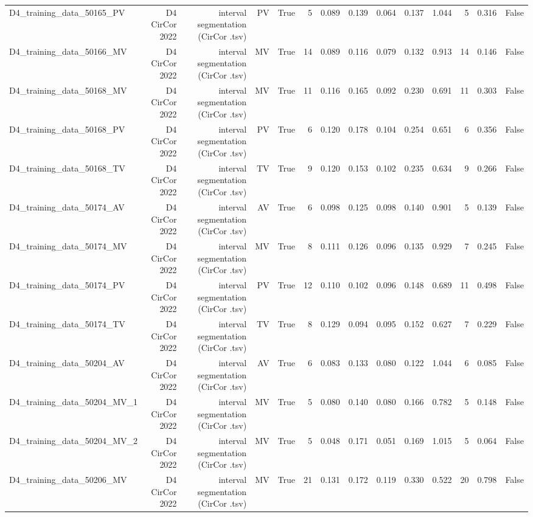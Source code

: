 \begin{table}[htbp]
\begin{tabular}{lrrrrrrrrrrrrr}
    D4\_training\_data\_50165\_PV & D4 CirCor 2022 & interval segmentation (CirCor .tsv) & PV & True & 5 & 0.089 & 0.139 & 0.064 & 0.137 & 1.044 & 5 & 0.316 & False \\
    D4\_training\_data\_50166\_MV & D4 CirCor 2022 & interval segmentation (CirCor .tsv) & MV & True & 14 & 0.089 & 0.116 & 0.079 & 0.132 & 0.913 & 14 & 0.146 & False \\
    D4\_training\_data\_50168\_MV & D4 CirCor 2022 & interval segmentation (CirCor .tsv) & MV & True & 11 & 0.116 & 0.165 & 0.092 & 0.230 & 0.691 & 11 & 0.303 & False \\
    D4\_training\_data\_50168\_PV & D4 CirCor 2022 & interval segmentation (CirCor .tsv) & PV & True & 6 & 0.120 & 0.178 & 0.104 & 0.254 & 0.651 & 6 & 0.356 & False \\
    D4\_training\_data\_50168\_TV & D4 CirCor 2022 & interval segmentation (CirCor .tsv) & TV & True & 9 & 0.120 & 0.153 & 0.102 & 0.235 & 0.634 & 9 & 0.266 & False \\
    D4\_training\_data\_50174\_AV & D4 CirCor 2022 & interval segmentation (CirCor .tsv) & AV & True & 6 & 0.098 & 0.125 & 0.098 & 0.140 & 0.901 & 5 & 0.139 & False \\
    D4\_training\_data\_50174\_MV & D4 CirCor 2022 & interval segmentation (CirCor .tsv) & MV & True & 8 & 0.111 & 0.126 & 0.096 & 0.135 & 0.929 & 7 & 0.245 & False \\
    D4\_training\_data\_50174\_PV & D4 CirCor 2022 & interval segmentation (CirCor .tsv) & PV & True & 12 & 0.110 & 0.102 & 0.096 & 0.148 & 0.689 & 11 & 0.498 & False \\
    D4\_training\_data\_50174\_TV & D4 CirCor 2022 & interval segmentation (CirCor .tsv) & TV & True & 8 & 0.129 & 0.094 & 0.095 & 0.152 & 0.627 & 7 & 0.229 & False \\
    D4\_training\_data\_50204\_AV & D4 CirCor 2022 & interval segmentation (CirCor .tsv) & AV & True & 6 & 0.083 & 0.133 & 0.080 & 0.122 & 1.044 & 6 & 0.085 & False \\
    D4\_training\_data\_50204\_MV\_1 & D4 CirCor 2022 & interval segmentation (CirCor .tsv) & MV & True & 5 & 0.080 & 0.140 & 0.080 & 0.166 & 0.782 & 5 & 0.148 & False \\
    D4\_training\_data\_50204\_MV\_2 & D4 CirCor 2022 & interval segmentation (CirCor .tsv) & MV & True & 5 & 0.048 & 0.171 & 0.051 & 0.169 & 1.015 & 5 & 0.064 & False \\
    D4\_training\_data\_50206\_MV & D4 CirCor 2022 & interval segmentation (CirCor .tsv) & MV & True & 21 & 0.131 & 0.172 & 0.119 & 0.330 & 0.522 & 20 & 0.798 & False \\

\end{tabular}
\end{table}
